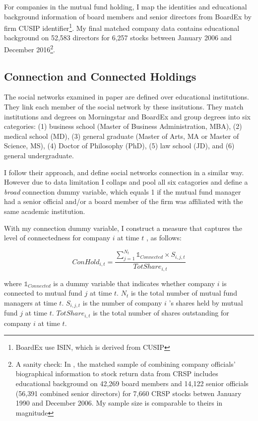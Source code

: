 \documentclass[11pt]{article}
\begin{document}
\begin{doublespace}
For companies in the mutual fund holding, I map the identities and educational background information of board members and senior directors from BoardEx by firm CUSIP identifier\footnote{BoardEx use ISIN, which is derived from CUSIP}. My final matched company data contains educational background on 52,583 directors for 6,257 stocks between January 2006 and December 2016\footnote{A sanity check: In \cite{cohen2008small}, the matched sample of combining company officials' biographical information to stock return data from CRSP includes educational background on 42,269 board members and 14,122 senior officials (56,391 combined senior directors) for 7,660 CRSP stocks betwen January 1990 and December 2006. My sample size is comparable to theirs in magnitude}.

\subsection{Connection and Connected Holdings}
The social networks examined in \cite{cohen2008small} paper are defined over educational institutions. They link each member of the social network by these insitutions. They match institutions and degrees on Morningstar and BoardEx and group degrees into six categories: (1) business school (Master of Business Administration, MBA), (2) medical school (MD), (3) general graduate (Master of Arts, MA or Master of Science, MS), (4) Doctor of Philosophy (PhD), (5) law school (JD), and (6) general undergraduate. 

I follow their approach, and define social networks connection in a similar way. However due to data limitation I collaps and pool all six catagories and define a \emph{broad} connection dummy variable, which equals 1 if the mutual fund manager had a senior official and/or a board member of the firm was affiliated with the same academic institution. 

With my connection dummy variable, I construct a measure that captures the level of connectedness for company $i$ at time $t$ , as follows:

\begin{equation}
 ConHold_{i,t} = \frac{\sum_{j=1}^{N_t}\mathbb{1}_{Connected} \times S_{i,j,t}} {TotShare_{i,t}}
\label{eq:eq1}
\end{equation}

where $\mathbb{1}_{Connected}$ is a dummy variable that indicates whether company $i$ is connected to mutual fund $j$ at time $t$. $N_t$ is the total number of mutual fund managers at time $t$.  $S_{i,j,t}$ is the number of company $i$ 's shares held by mutual fund $j$ at time $t$. $TotShare_{i,t}$ is the total number of shares outstanding for company $i$ at time $t$. 


\end{doublespace}
\end{document}

